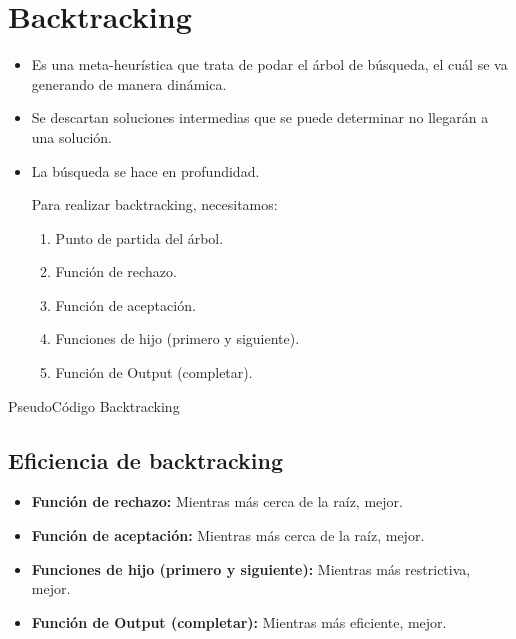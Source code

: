 \documentclass{templateNote}
\begin{document}
\section{Backtracking}
\begin{itemize}
    \item Es una meta-heurística que trata de podar el árbol de búsqueda, el cuál se va generando de manera dinámica.
    
    \item Se descartan soluciones intermedias que se puede determinar no llegarán a una solución.
    
    \item La búsqueda se hace en profundidad.

    Para realizar backtracking, necesitamos:
    \begin{enumerate}
        \item Punto de partida del árbol.
        
        \item Función de rechazo.
        
        \item Función de aceptación.
        
        \item Funciones de hijo (primero y siguiente).
        
        \item Función de Output (completar).
    \end{enumerate}
\end{itemize}

\begin{algorithm*}[H]
    \caption{PseudoCódigo Backtracking}
\end{algorithm*}

\subsection*{Eficiencia de backtracking}

\begin{itemize}
    \item \textbf{Función de rechazo:} Mientras más cerca de la raíz, mejor.
    
    \item \textbf{Función de aceptación:} Mientras más cerca de la raíz, mejor.
    
    \item \textbf{Funciones de hijo (primero y siguiente):} Mientras más restrictiva, mejor.
    
    \item \textbf{Función de Output (completar):} Mientras más eficiente, mejor.
\end{itemize}
\end{document}
